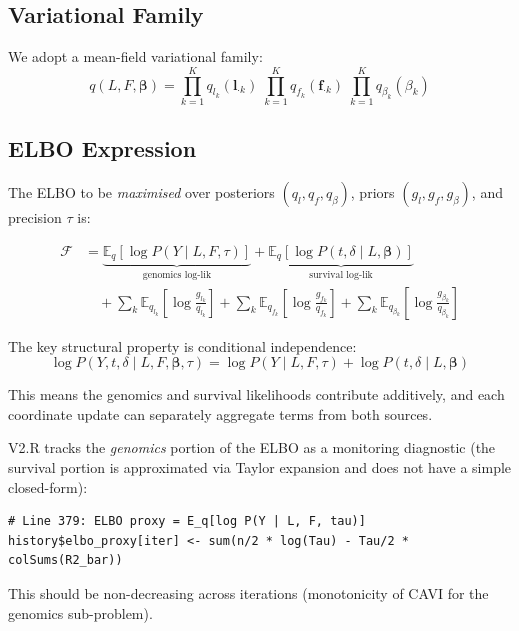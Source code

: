 \documentclass[11pt]{article}
\begin{document}
\subsection{Variational Family}

We adopt a mean-field variational family:
\begin{equation}
  q(L, F, \bm{\beta}) = \prod_{k=1}^K q_{l_k}(\bm{l}_{\cdot k})
  \;\prod_{k=1}^K q_{f_k}(\bm{f}_{\cdot k})
  \;\prod_{k=1}^K q_{\beta_k}(\beta_k)
\end{equation}

\subsection{ELBO Expression}

The ELBO to be \emph{maximised} over posteriors $(q_l, q_f, q_\beta)$,
priors $(g_l, g_f, g_\beta)$, and precision $\tau$ is:

\begin{align}\label{eq:elbo}
  \mathcal{F} &=
  \underbrace{\mathbb{E}_{q}\!\left[\log P(Y \mid L, F, \tau)\right]}_{\text{genomics log-lik}}
  +\underbrace{\mathbb{E}_{q}\!\left[\log P(t, \delta \mid L, \bm{\beta})\right]}_{\text{survival log-lik}}
  \nonumber\\
  &\quad + \sum_k \mathbb{E}_{q_{l_k}}\!\left[\log\frac{g_{l_k}}{q_{l_k}}\right]
   + \sum_k \mathbb{E}_{q_{f_k}}\!\left[\log\frac{g_{f_k}}{q_{f_k}}\right]
   + \sum_k \mathbb{E}_{q_{\beta_k}}\!\left[\log\frac{g_{\beta_k}}{q_{\beta_k}}\right]
\end{align}

The key structural property is conditional independence:
\begin{equation}\label{eq:lik-decomp}
  \log P(Y, t, \delta \mid L, F,\bm{\beta}, \tau)
  = \log P(Y \mid L, F, \tau) + \log P(t, \delta \mid L, \bm{\beta})
\end{equation}

This means the genomics and survival likelihoods contribute additively,
and each coordinate update can separately aggregate terms from both sources.

\begin{codebox}
V2.R tracks the \emph{genomics} portion of the ELBO as a monitoring
diagnostic (the survival portion is approximated via Taylor expansion and
does not have a simple closed-form):
\begin{lstlisting}[style=Rstyle]
# Line 379: ELBO proxy = E_q[log P(Y | L, F, tau)]
history$elbo_proxy[iter] <- sum(n/2 * log(Tau) - Tau/2 * colSums(R2_bar))
\end{lstlisting}
This should be non-decreasing across iterations (monotonicity of CAVI
for the genomics sub-problem).
\end{codebox}
\end{document}
